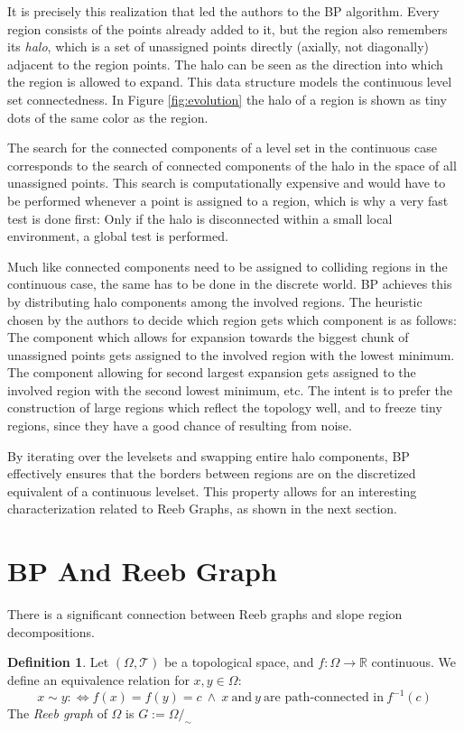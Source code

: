 \documentclass[a4paper,12pt,notitlepage,fullpage]{paper}
\theoremstyle{plain}
\theoremstyle{definition}
\newtheorem{defn}[thm]{Definition} %
\begin{document}
It is precisely this realization that led the authors to the BP algorithm. Every region consists of the points already added to it, but the region also remembers its \emph{halo}, which is a set of unassigned points directly (axially, not diagonally) adjacent to the region points. The halo can be seen as the direction into which the region is allowed to expand. This data structure models the continuous level set connectedness. In Figure \ref{fig:evolution} the halo of a region is shown as tiny dots of the same color as the region.

The search for the connected components of a level set in the continuous case corresponds to the search of connected components of the halo in the space of all unassigned points. This search is computationally expensive and would have to be performed whenever a point is assigned to a region, which is why a very fast test is done first: Only if the halo is disconnected within a small local environment, a global test is performed.

Much like connected components need to be assigned to colliding regions in the continuous case, the same has to be done in the discrete world. BP achieves this by distributing halo components among the involved regions. The heuristic chosen by the authors to decide which region gets which component is as follows: The component which allows for expansion towards the biggest chunk of unassigned points gets assigned to the involved region with the lowest minimum. The component allowing for second largest expansion gets assigned to the involved region with the second lowest minimum, etc. The intent is to prefer the construction of large regions which reflect the topology well, and to freeze tiny regions, since they have a good chance of resulting from noise.


By iterating over the levelsets and swapping entire halo components, BP effectively ensures that the borders between regions are on the discretized equivalent of a continuous levelset. This property allows for an interesting characterization related to Reeb Graphs, as shown in the next section.

\section{BP And Reeb Graph}
\label{sec:reeb}

There is a significant connection between Reeb graphs and slope region decompositions.

\begin{defn}
Let $(\Omega, \mathcal T)$ be a topological space, and $f: \Omega \to \mathbb R$ continuous. We define an equivalence relation for $x,y \in \Omega$: 
\begin{equation*}
x \sim y :\Leftrightarrow f(x) = f(y) = c ~\land ~ x ~\text{and}~ y ~\text{are path-connected in}~ f^{-1}(c)
\end{equation*}
The \emph{Reeb graph} of $\Omega$ is $G := \Omega/_\sim$
\end{defn}
\end{document}
